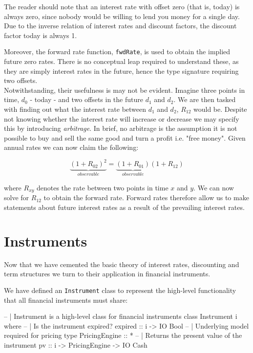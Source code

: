 The reader should note that an interest rate with offset zero (that is, today) is
always zero, since nobody would be willing to lend you money for a single day.
Due to the inverse relation of interest rates and discount factors, the discount factor
today is always 1.

Moreover, the forward rate function, \texttt{fwdRate}, is used to obtain the 
implied future zero rates. There is no conceptual leap required to understand 
these, as they are simply interest rates in the future, hence the type 
signature requiring two offsets.\\
Notwithstanding, their usefulness is may not be evident. 
Imagine three points in time, $d_0$ - today - and two
offsets in the future $d_1$ and $d_2$. We are then tasked with finding out
what the interest rate between $d_1$ and $d_2$, $R_{12}$ would be. Despite not 
knowing whether the interest rate will increase or decrease we may specify 
this by introducing \emph{arbitrage}. In brief, no arbitrage is the
assumption it is not possible to buy and sell the same good and turn a
profit i.e. "free money". Given annual rates we can now claim the following:

\begin{equation}
\underbrace{(1+R_{02})^2}_{observable} = \underbrace{(1+R_{01})}_{observable}(1 + R_{12})
\end{equation}

where $R_{xy}$ denotes the rate between two points in time $x$ and $y$. We
can now solve for $R_{12}$ to obtain the forward rate. Forward rates therefore
allow us to make statements about future interest rates as a result of the
prevailing interest rates.


\section{Instruments}\label{sec:instruments}

Now that we have cemented the basic theory of interest rates, discounting
and term structures we turn to their application in financial instruments.

We have defined an \texttt{Instrument} class to represent the high-level
functionality that all financial instruments must share:

\begin{hscode}
-- | Instrument is a high-level class for financial instruments
class Instrument i where
  -- | Is the instrument expired?
  expired :: i -> IO Bool
  -- | Underlying model required for pricing
  type PricingEngine :: *
  -- | Returns the present value of the instrument
  pv :: i -> PricingEngine -> IO Cash
\end{hscode}

